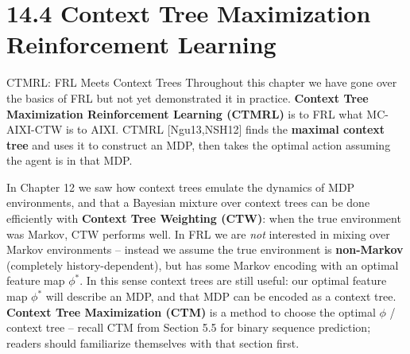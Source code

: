 \documentclass[aspectratio=169,10pt]{beamer}
\begin{document}
\section{14.4 Context Tree Maximization Reinforcement Learning}

\begin{frame}{CTMRL: FRL Meets Context Trees}
  Throughout this chapter we have gone over the basics of FRL but not yet
  demonstrated it in practice. \textbf{Context Tree Maximization
  Reinforcement Learning (CTMRL)} is to FRL what MC-AIXI-CTW is to AIXI.
  CTMRL [Ngu13,NSH12] finds the \textbf{maximal context tree} and uses it
  to construct an MDP, then takes the optimal action assuming the agent is
  in that MDP.

  \vspace{0.4em}
  In Chapter 12 we saw how context trees emulate the dynamics of MDP
  environments, and that a Bayesian mixture over context trees can be done
  efficiently with \textbf{Context Tree Weighting (CTW)}: when the true
  environment was Markov, CTW performs well. In FRL we are \emph{not}
  interested in mixing over Markov environments -- instead we assume the
  true environment is \textbf{non-Markov} (completely history-dependent),
  but has some Markov encoding with an optimal feature map $\phi^*$. In
  this sense context trees are still useful: our optimal feature map
  $\phi^*$ will describe an MDP, and that MDP can be encoded as a context
  tree. \textbf{Context Tree Maximization (CTM)} is a method to choose the
  optimal $\phi$ / context tree -- recall CTM from Section 5.5 for binary
  sequence prediction; readers should familiarize themselves with that
  section first.
\end{frame}
\end{document}
